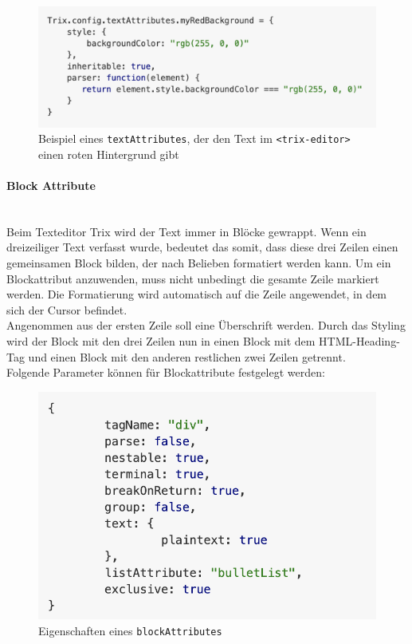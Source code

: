\begin{figure}[H]
\begin{center}
	\includegraphics[scale=.7]{images/text_attributes_example.png}
\end{center}
	\caption{Beispiel eines \texttt{textAttributes}, der den Text im \texttt{<trix-editor>} einen roten Hintergrund gibt}
\end{figure}

\paragraph{Block Attribute}
\label{paragraph_blockAttribute}\mbox{}\\
Beim Texteditor Trix wird der Text immer in Blöcke gewrappt. Wenn ein dreizeiliger Text verfasst wurde, bedeutet das somit, dass diese drei Zeilen einen gemeinsamen Block bilden, der nach Belieben formatiert werden kann. Um ein Blockattribut anzuwenden, muss nicht unbedingt die gesamte Zeile markiert werden. Die Formatierung wird automatisch auf die Zeile angewendet, in dem sich der Cursor befindet.\\
Angenommen aus der ersten Zeile soll eine Überschrift werden. Durch das Styling wird der Block mit den drei Zeilen nun in einen Block mit dem HTML-Heading-Tag und einen Block mit den anderen restlichen zwei Zeilen getrennt.\\
Folgende Parameter können für Blockattribute festgelegt werden:

\begin{figure}[H]
\begin{center}
	\includegraphics[scale=.7]{images/block_attributes.png}
\end{center}
	\caption{Eigenschaften eines \texttt{blockAttributes}}
\end{figure}


